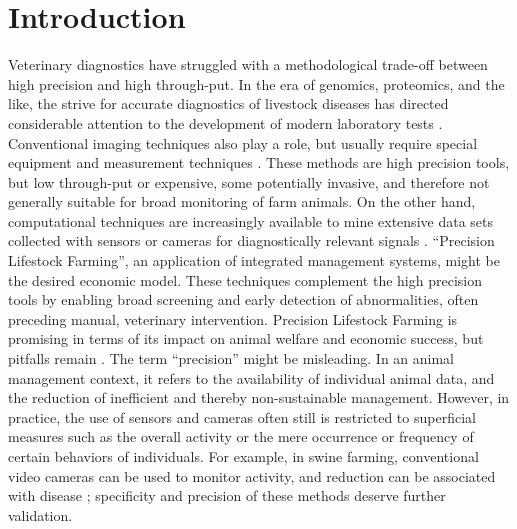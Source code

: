 \section{Introduction}
\label{intro}
Veterinary diagnostics have struggled with a methodological trade-off between high precision and high through-put.
In the era of genomics, proteomics, and the like, the strive for accurate diagnostics of livestock diseases has directed considerable attention to the development of modern laboratory tests \citep{Howson2017,Lamy2012}.
Conventional imaging techniques also play a role, but usually require special equipment and measurement techniques \citep[e.g. radiography, microscopy, ultrasound, \textit{cf.}][]{Yitbarek2022}.
These methods are high precision tools, but low through-put or expensive, some potentially invasive, and therefore not generally suitable for broad monitoring of farm animals.
On the other hand, computational techniques are increasingly available to mine extensive data sets collected with sensors or cameras for diagnostically relevant signals \citep{Neethirajan2020,Wurtz2019,Pineiro2019,Gomez2021,Netukova2021}.
``Precision Lifestock Farming'', an application of integrated management systems, might be the desired economic model.
These techniques complement the high precision tools by enabling broad screening and early detection of abnormalities, often preceding manual, veterinary intervention.
Precision Lifestock Farming is promising in terms of its impact on animal welfare and economic success, but pitfalls remain \citep{Wathes2008,Azarpajouh2020}.
The term ``precision'' might be misleading.
In an animal management context, it refers to the availability of individual animal data, and the reduction of inefficient and thereby non-sustainable management.
However, in practice, the use of sensors and cameras often still is restricted to superficial measures such as the overall activity or the mere occurrence or frequency of certain behaviors of individuals.
For example, in swine farming, conventional video cameras can be used to monitor activity, and reduction can be associated with disease \citep{FernandezCarrion2017,Benjamin2019,Vranken2017}; specificity and precision of these methods deserve further validation.


